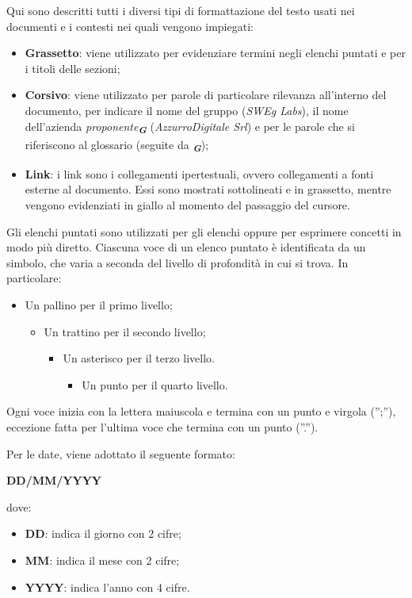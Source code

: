 Qui sono descritti tutti i diversi tipi di formattazione del testo usati nei documenti e i contesti
nei quali vengono impiegati:
\begin{itemize}
    \item \textbf{Grassetto}: viene utilizzato per evidenziare termini negli elenchi puntati e per i titoli
    delle sezioni;
    \item \textbf{Corsivo}: viene utilizzato per parole di particolare rilevanza all’interno del documento, 
    per indicare il nome del gruppo (\emph{SWEg Labs}), il nome dell’azienda \emph{proponente}\textsubscript{\textit{\textbf{G}}} 
    (\emph{AzzurroDigitale Srl}) e per le parole che si riferiscono al glossario (seguite da \textsubscript{\textit{\textbf{G}}});
    \item \textbf{Link}: i link sono i collegamenti ipertestuali, ovvero collegamenti a fonti esterne al
    documento. Essi sono mostrati sottolineati e in grassetto, mentre vengono evidenziati in giallo
    al momento del passaggio del cursore.
\end{itemize}

Gli elenchi puntati sono utilizzati per gli elenchi oppure per esprimere concetti in modo più
diretto. Ciascuna voce di un elenco puntato è identificata da un simbolo, che varia a seconda
del livello di profondità in cui si trova. In particolare:
\begin{itemize}
    \item Un pallino per il primo livello;
    \begin{itemize}
        \item Un trattino per il secondo livello;
        \begin{itemize}
            \item Un asterisco per il terzo livello.
            \begin{itemize}
                \item Un punto per il quarto livello.
            \end{itemize}
        \end{itemize}
    \end{itemize}
\end{itemize}
Ogni voce inizia con la lettera maiuscola e termina con un punto e virgola (”;”), eccezione
fatta per l’ultima voce che termina con un punto (”.”).

Per le date, viene adottato il seguente formato:
\begin{center}
    \textbf{DD/MM/YYYY}
\end{center}
dove:
\begin{itemize}
    \item \textbf{DD}: indica il giorno con 2 cifre;
    \item \textbf{MM}: indica il mese con 2 cifre;
    \item \textbf{YYYY}: indica l’anno con 4 cifre.
\end{itemize}

